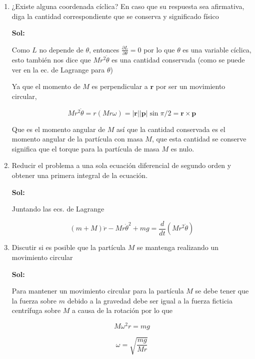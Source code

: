 \documentclass[12pt,a4paper]{article}
\begin{document}
\begin{enumerate}
\begin{enumerate}
    
    \item ¿Existe alguna coordenada cíclica? En caso que su respuesta sea afirmativa, diga la cantidad correspondiente que se conserva y significado físico
    
    \textbf{Sol:}
    
    Como $L$ no depende de $\theta$, entonces $\frac{\partial L}{\partial \theta} = 0$ por lo que $\theta$ es una variable cíclica, esto también nos dice que $Mr^2\dot{\theta}$ es una cantidad conservada (como se puede ver en la ec. de Lagrange para $\theta$)
    
    Ya que el momento de $M$ es perpendicular a $\mathbf{r}$ por ser un movimiento circular,
    
    \begin{equation*}
        M r^2 \dot{\theta} = r(Mr \omega) = |\mathbf{r}||\mathbf{p}| \sin{\pi/2} = \mathbf{r} \times \mathbf{p}
    \end{equation*}
    
    Que es el momento angular de $M$ así que la cantidad conservada es el momento angular de la partícula con masa $M$, que esta cantidad se conserve significa que el torque para la partícula de masa $M$ es nulo.
    
    \item Reducir el problema a una sola ecuación diferencial de segundo orden y obtener una primera integral de la ecuación.
    
    \textbf{Sol:}
    
    Juntando las ecs. de Lagrange 
    
    \begin{equation*}
        (m+M)\ddot{r} - Mr\dot{\theta}^2+mg =  \frac{d}{dt}\left(Mr^2\dot{\theta}\right)
    \end{equation*}
    
    
    
    \item Discutir si es posible que la partícula $M$ se mantenga realizando un movimiento circular
    
    \textbf{Sol:}
    
    
    
    
    Para mantener un movimiento circular para la partícula $M$ se debe tener que la fuerza sobre $m$ debido a la gravedad debe ser igual a la fuerza ficticia centrífuga sobre $M$ a causa de la rotación por lo que
    
    \begin{equation*}
        M \omega^2 r = mg
    \end{equation*}
    
    \begin{equation*}
        \omega = \sqrt{\frac{mg}{Mr}}
    \end{equation*}
    
\end{enumerate}
    
    
\end{enumerate}
\end{document}
